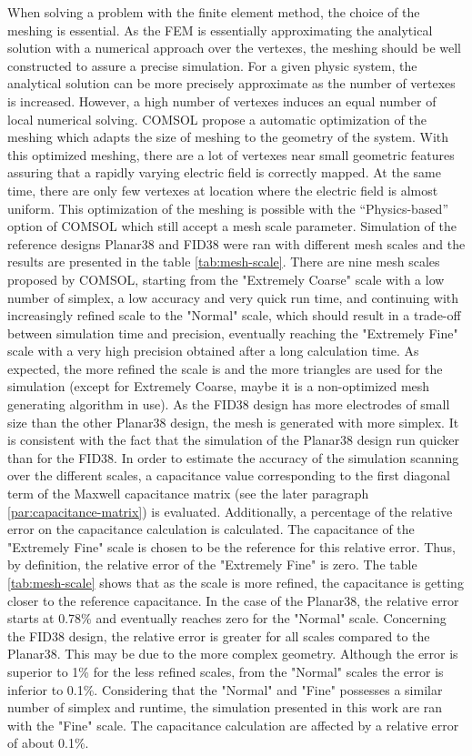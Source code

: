 When solving a problem with the finite element method, the choice of the meshing is essential. As the FEM is essentially approximating the analytical solution with a numerical approach over the vertexes, the meshing should be well constructed to assure a precise simulation. For a given physic system, the analytical solution can be more precisely approximate as the number of vertexes is increased. However, a high number of vertexes induces an equal number of local numerical solving. COMSOL propose a automatic optimization of the meshing which adapts the size of meshing to the geometry of the system. With this optimized meshing, there are a lot of vertexes near small geometric features assuring that a rapidly varying electric field is correctly mapped. At the same time, there are only few vertexes at location where the electric field is almost uniform. This optimization of the meshing is possible with the “Physics-based” option of COMSOL which still accept a mesh scale parameter. Simulation of the reference designs Planar38 and FID38 were ran with different mesh scales and the results are presented in the table \ref{tab:mesh-scale}. There are nine mesh scales proposed by COMSOL, starting from the "Extremely Coarse" scale with a low number of simplex, a low accuracy and very quick run time, and continuing with increasingly refined scale to the "Normal" scale, which should result in a trade-off between simulation time and precision, eventually reaching the "Extremely Fine" scale with a very high precision obtained after a long calculation time. As expected, the more refined the scale is and the more triangles are used for the simulation (except for Extremely Coarse, maybe it is a non-optimized mesh generating algorithm in use). As the FID38 design has more electrodes of small size than the other Planar38 design, the mesh is generated with more simplex. It is consistent with the fact that the simulation of the Planar38 design run quicker than for the FID38.
In order to estimate the accuracy of the simulation scanning over the different scales, a capacitance value corresponding to the first diagonal term of the Maxwell capacitance matrix (see the later paragraph \ref{par:capacitance-matrix}) is evaluated. Additionally, a percentage of the relative error on the capacitance calculation is calculated. The capacitance of the "Extremely Fine" scale is chosen to be the reference for this relative error. Thus, by definition, the relative error of the "Extremely Fine" is zero. The table \ref{tab:mesh-scale} shows that as the scale is more refined, the capacitance is getting closer to the reference capacitance.
In the case of the Planar38, the relative error starts at 0.78\% and eventually reaches zero for the "Normal" scale. Concerning the FID38 design, the relative error is greater for all scales compared to the Planar38. This may be due to the more complex geometry. Although the error is superior to 1\% for the less refined scales, from the "Normal" scales the error is inferior to 0.1\%.
Considering that the "Normal" and "Fine" possesses a similar number of simplex and runtime, the simulation presented in this work are ran with the "Fine" scale. The capacitance calculation are affected by a relative error of about 0.1\%. 

